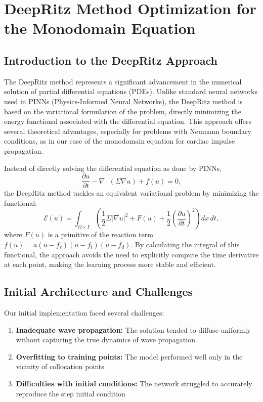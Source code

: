 \section{DeepRitz Method Optimization for the Monodomain Equation}

\subsection{Introduction to the DeepRitz Approach}


The DeepRitz method represents a significant advancement in the numerical solution of partial differential equations (PDEs). Unlike standard neural networks used in PINNs (Physics-Informed Neural Networks), the DeepRitz method is based on the variational formulation of the problem, directly minimizing the energy functional associated with the differential equation. This approach offers several theoretical advantages, especially for problems with Neumann boundary conditions, as in our case of the monodomain equation for cardiac impulse propagation.

Instead of directly solving the differential equation as done by PINNs,
\[
\frac{\partial u}{\partial t} - \nabla \cdot (\Sigma \nabla u) + f(u) = 0,
\]
the DeepRitz method tackles an equivalent variational problem by minimizing the functional:
\[
\mathcal{E}(u) = \int_{\Omega \times I} \left( \frac{1}{2} \Sigma |\nabla u|^2 + F(u) + \frac{1}{2} \left(\frac{\partial u}{\partial t}\right)^2 \right) dx\,dt,
\]
where \( F(u) \) is a primitive of the reaction term \( f(u) = a(u - f_r)(u - f_t)(u - f_d) \). By calculating the integral of this functional, the approach avoids the need to explicitly compute the time derivative at each point, making the learning process more stable and efficient.


\subsection{Initial Architecture and Challenges}

Our initial implementation faced several challenges:
\begin{enumerate}
    \item \textbf{Inadequate wave propagation:} The solution tended to diffuse uniformly without capturing the true dynamics of wave propagation
    \item \textbf{Overfitting to training points:} The model performed well only in the vicinity of collocation points
    \item \textbf{Difficulties with initial conditions:} The network struggled to accurately reproduce the step initial condition
\end{enumerate}


